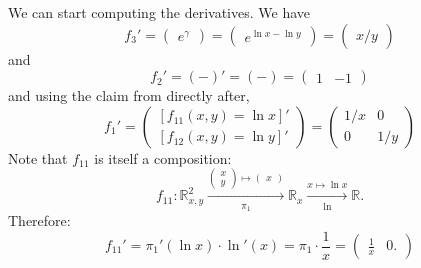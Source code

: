 \begin{itemize}
\begin{example}
        We can start computing the derivatives. We have
        \begin{equation}
            f_3' = \begin{pmatrix}
                e^\gamma
            \end{pmatrix} = \begin{pmatrix}
                e^{\ln x-\ln y}
            \end{pmatrix} = \begin{pmatrix}
                x/y
            \end{pmatrix}
        \end{equation}
        and 
        \begin{equation}
            f_2' = (-)' = (-) = \begin{pmatrix}
                1 & -1
            \end{pmatrix}
        \end{equation}
        and using the claim from directly after,
        \begin{equation}
            f_1' = \begin{pmatrix}
                \left[f_{11}(x,y)=\ln x\right]' \\ 
                \left[f_{12}(x,y)=\ln y\right]'
            \end{pmatrix} = \begin{pmatrix}
                1/x & 0 \\ 
                0 & 1/y
            \end{pmatrix}
        \end{equation}
        Note that $f_{11}$ is itself a composition: 
        \begin{equation}
            f_{11}: \mathbb{R}_{x,y}^2 \xrightarrow[\pi_1]{\begin{pmatrix}
                x \\ y
            \end{pmatrix}\mapsto \begin{pmatrix}
                x
            \end{pmatrix}} \mathbb{R}_x \xrightarrow[\ln]{x \mapsto \ln x} \mathbb{R}.
        \end{equation}
        Therefore: 
        \begin{equation}
            f_11' = \pi_1'(\ln x) \cdot \ln'(x) = \pi_1 \cdot \frac{1}{x} = \begin{pmatrix}
                \frac{1}{x} & 0.
            \end{pmatrix}
        \end{equation}

\end{example}
\end{itemize}
